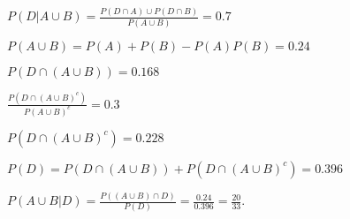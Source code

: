 \documentclass{article}
\begin{document}






%
%
$P(D|A \cup B) = \frac{P(D\cap A) \cup P(D \cap B)}{P(A \cup B)} = 0.7$
\newline

\noindent
$P(A\cup B) = P(A) + P(B) - P(A) P(B) = 0.24$
\newline

\noindent
$P(D \cap (A \cup B)) = 0.168$
\newline

\noindent
$\frac{P(D \cap (A \cup B)^c)}{P(A \cup B)^c} = 0.3$
\newline

\noindent
$P(D \cap (A \cup B)^c) = 0.228$
\newline

\noindent
$P(D)= P(D \cap (A \cup B)) + P(D \cap (A \cup B)^c) = 0.396$
\newline

\noindent
$P(A \cup B | D) = \frac{P((A\cup B)  \cap D)}{P(D)} = \frac{0.24}{0.396} = \frac{20}{33}$.
\end{document}
